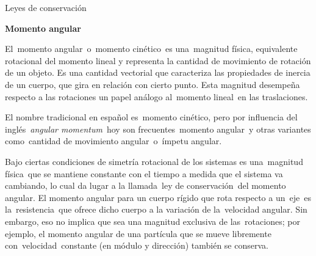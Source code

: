 \begin{myblock}{Leyes de conservación}
\begin{small}
\textbf{Momento angular}

El momento angular o momento cinético es una magnitud física, equivalente rotacional del momento lineal y representa la cantidad de movimiento de rotación de un objeto. Es una cantidad vectorial que caracteriza las propiedades de inercia de un cuerpo, que gira en relación con cierto punto. Esta magnitud desempeña respecto a las rotaciones un papel análogo al momento lineal en las traslaciones.

El nombre tradicional en español es momento cinético, pero por influencia del inglés \emph{angular momentum} hoy son frecuentes momento angular y otras variantes como cantidad de movimiento angular o ímpetu angular.

Bajo ciertas condiciones de simetría rotacional de los sistemas es una magnitud física que se mantiene constante con el tiempo a medida que el sistema va cambiando, lo cual da lugar a la llamada ley de conservación del momento angular. El momento angular para un cuerpo rígido que rota respecto a un eje es la resistencia que ofrece dicho cuerpo a la variación de la velocidad angular. Sin embargo, eso no implica que sea una magnitud exclusiva de las rotaciones; por ejemplo, el momento angular de una partícula que se mueve libremente con velocidad constante (en módulo y dirección) también se conserva.
\end{small}	
\end{myblock}



	